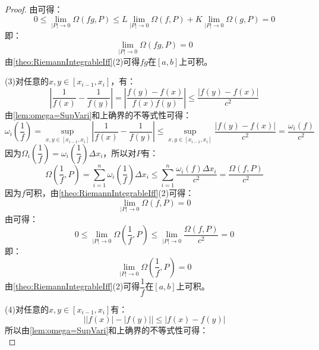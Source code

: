 \begin{proof}
	由可得：
	\begin{equation*}
		0\leqslant\lim_{|P|\to0}\Omega(fg,P)\leqslant L\lim_{|P|\to0}\Omega(f,P)+K\lim_{|P|\to0}\Omega(g,P)=0
	\end{equation*}
	即：
	\begin{equation*}
		\lim_{|P|\to0}\Omega(fg,P)=0
	\end{equation*}
	由\cref{theo:RiemannIntegrableIff}(2)可得$fg$在$[a,b]$上可积。\par
	(3)对任意的$x,y\in[x_{i-1},x_i]$，有：
	\begin{equation*}
		\left|\frac{1}{f(x)}-\frac{1}{f(y)}\right|=\left|\frac{f(y)-f(x)}{f(x)f(y)}\right|\leqslant\frac{|f(y)-f(x)|}{c^2}
	\end{equation*}
	由\cref{lem:omega=SupVari}和上确界的不等式性可得：
	\begin{equation*}
		\omega_i\left(\frac{1}{f}\right)=\sup_{x,y\in[x_{i-1},x_i]}\left|\frac{1}{f(x)}-\frac{1}{f(y)}\right|\leqslant\sup_{x,y\in[x_{i-1},x_i]}\frac{|f(y)-f(x)|}{c^2}=\frac{\omega_i(f)}{c^2}
	\end{equation*}
	因为$\Omega_i\left(\dfrac{1}{f}\right)=\omega_i\left(\dfrac{1}{f}\right)\Delta x_i$，所以对$P$有：
	\begin{equation*}
		\Omega\left(\dfrac{1}{f},P\right)=\sum_{i=1}^{n}\omega_i\left(\dfrac{1}{f}\right)\Delta x_i\leqslant\sum_{i=1}^{n}\frac{\omega_i(f)\Delta x_i}{c^2}=\frac{\Omega(f,P)}{c^2}
	\end{equation*}
	因为$f$可积，由\cref{theo:RiemannIntegrableIff}(2)可得：
	\begin{equation*}
		\lim_{|P|\to0}\Omega(f,P)=0
	\end{equation*}
	由可得：
	\begin{equation*}
		0\leqslant\lim_{|P|\to0}\Omega\left(\frac{1}{f},P\right)\leqslant\lim_{|P|\to0}\frac{\Omega(f,P)}{c^2}=0
	\end{equation*}
	即：
	\begin{equation*}
		\lim_{|P|\to0}\Omega\left(\frac{1}{f},P\right)=0
	\end{equation*}
	由\cref{theo:RiemannIntegrableIff}(2)可得$\dfrac{1}{f}$在$[a,b]$上可积。\par
	(4)对任意的$x,y\in[x_{i-1},x_i]$有：
	\begin{equation*}
		\Big||f(x)|-|f(y)|\Big|\leqslant|f(x)-f(y)|
	\end{equation*}
	所以由\cref{lem:omega=SupVari}和上确界的不等式性可得：
	\begin{equation*}

\end{equation*}
\end{proof}
